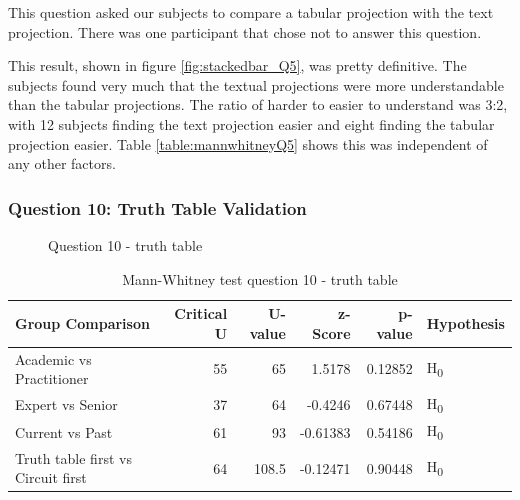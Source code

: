 This question asked our subjects to compare a tabular projection with the text projection.
There was one participant that chose not to answer this question.

This result, shown in figure \ref{fig:stackedbar_Q5}, was pretty definitive.
The subjects found very much that the textual projections were more understandable than the tabular projections.
The ratio of harder to easier to understand was 3:2, with 12 subjects finding the text projection easier and eight finding the tabular projection easier.
Table \ref{table:mannwhitneyQ5} shows this was independent of any other factors.

\subsubsection{Question 10: Truth Table Validation}

\begin{figure}
    \centering
    \caption{Question 10 - truth table}
    \label{fig:stackedbar_Q6}
\end{figure}

\begin{table}
    \begin{center}
        \begin{tabular}{ |l ||r |r |r | r|l | } 
            \hline
            Group Comparison                   & Critical U & U-value & z-Score  & p-value & Hypothesis         \\
            \hline
            \hline
            Academic vs Practitioner           &  55        & 65      & 1.5178   & 0.12852 & H\textsubscript{0} \\ 
            \hline
            Expert vs Senior                   &  37        & 64      & -0.4246  & 0.67448 & H\textsubscript{0} \\ 
            \hline
            Current vs Past                    &  61        & 93      & -0.61383 & 0.54186 & H\textsubscript{0} \\ 
            \hline
            Truth table first vs Circuit first &  64        & 108.5   & -0.12471 & 0.90448 & H\textsubscript{0} \\ 
            \hline
        \end{tabular}
    \end{center}
    \caption{Mann-Whitney test question 10 - truth table}
    \label{table:mannwhitneyQ6}
\end{table}

